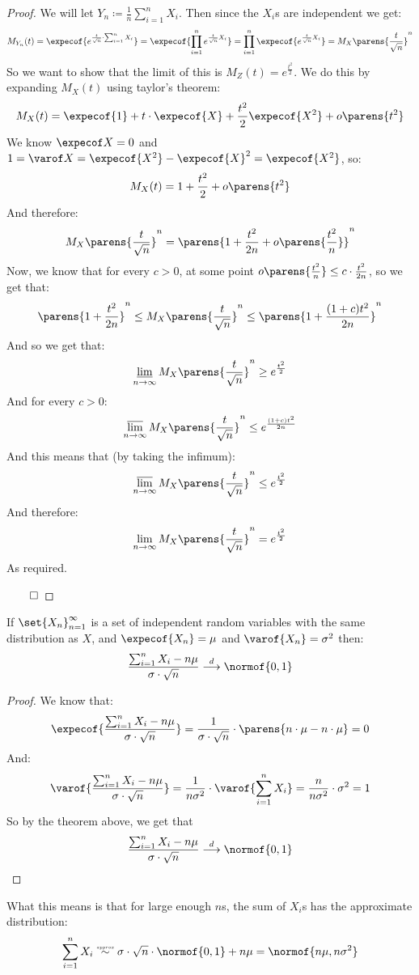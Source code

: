 \begin{proof}

	We will let $Y_n\coloneqq\frac1n\sum\limits_{i=1}^n X_i$.
	Then since the $X_i$s are independent we get:
	\[ M_{Y_n}(t) = \expecof{e^{\frac t{\sqrt n}\cdot\sum_{i=1}^n X_i}} = \expecof{\prod_{i=1}^n e^{\frac t{\sqrt n}X_i}} =
	\prod_{i=1}^n\expecof{e^{\frac t{\sqrt n}X_i}} = M_X\parens{\frac t{\sqrt n}}^n \]
	So we want to show that the limit of this is $M_Z(t)=e^{\frac{t^2}2}$.
	We do this by expanding $M_X(t)$ using taylor's theorem:
	\[ M_X(t) = \expecof{1} + t\cdot\expecof{X} + \frac{t^2}2\expecof{X^2} + o\parens{t^2} \]
	We know $\expecof X=0$ and $1=\varof X=\expecof{X^2}-\expecof{X}^2=\expecof{X^2}$, so:
	\[ M_X(t) = 1+\frac{t^2}2 + o\parens{t^2} \]
	And therefore:
	\[ M_X\parens{\frac t{\sqrt n}}^n = \parens{1 + \frac{t^2}{2n} + o\parens{\frac{t^2}n}}^n \]
	Now, we know that for every $c>0$, at some point $o\parens{\frac{t^2}n}\leq c\cdot\frac{t^2}{2n}$, so we get that:
	\[ \parens{1+\frac{t^2}{2n}}^n \leq M_X\parens{\frac t{\sqrt n}}^n \leq \parens{1 + \frac{(1+c)t^2}{2n}}^n \]
	And so we get that:
	\[ \liminf_{n\to\infty} M_X\parens{\frac t{\sqrt n}}^n \geq e^{\frac{t^2}2} \]
	And for every $c>0$:
	\[ \limsup_{n\to\infty} M_X\parens{\frac t{\sqrt n}}^n \leq e^{\frac{(1+c)t^2}{2n}} \]
	And this means that (by taking the infimum):
	\[ \limsup_{n\to\infty} M_X\parens{\frac t{\sqrt n}}^n \leq e^{\frac{t^2}2} \]
	And therefore:
	\[ \lim_{n\to\infty} M_X\parens{\frac t{\sqrt n}}^n = e^{\frac{t^2}2} \]
	As required.

	\hfill$\qed$

\end{proof}

\begin{coro*}

	If $\set{X_n}_{n=1}^\infty$ is a set of independent random variables with the same distribution as $X$,
	and $\expecof{X_n}=\mu$ and $\varof{X_n}=\sigma^2$ then:
	\[ \frac{\sum_{i=1}^n X_i - n\mu}{\sigma\cdot\sqrt n}\dilim\normof{0,1} \]

\end{coro*}

\begin{proof}

	We know that:
	\[ \expecof{\frac{\sum_{i=1}^n X_i - n\mu}{\sigma\cdot\sqrt n}} = \frac1{\sigma\cdot\sqrt n}\cdot\parens{n\cdot\mu - n\cdot\mu} = 0 \]
	And:
	\[ \varof{\frac{\sum_{i=1}^n X_i - n\mu}{\sigma\cdot\sqrt n}} = \frac1{n\sigma^2}\cdot\varof{\sum_{i=1}^n X_i} =
	\frac{n}{n\sigma^2}\cdot\sigma^2 = 1 \]
	So by the theorem above, we get that
	\[ \frac{\sum_{i=1}^n X_i - n\mu}{\sigma\cdot\sqrt n}\dilim\normof{0,1} \]

\end{proof}

\def\approxsim{\mathrel{\overset{\scalebox{0.7}{$\scriptscriptstyle approx$}}\sim}}

What this means is that for large enough $n$s, the sum of $X_i$s has the approximate distribution:
\[ \sum_{i=1}^n X_i \approxsim \sigma\cdot\sqrt n\cdot\normof{0,1} + n\mu = \normof{n\mu, n\sigma^2} \]

